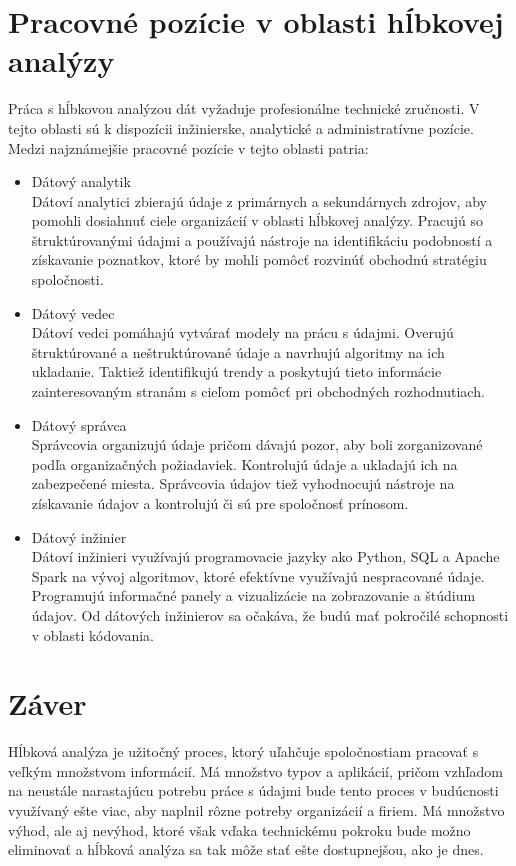 \documentclass[10pt,twoside,slovak,a4paper]{article}
\begin{document}
\section{Pracovné pozície v oblasti hĺbkovej analýzy}
Práca s hĺbkovou analýzou dát vyžaduje profesionálne technické zručnosti. V tejto oblasti sú k dispozícii inžinierske, analytické a administratívne pozície. Medzi najznámejšie pracovné pozície v tejto oblasti patria:
\begin{itemize}
\item Dátový analytik\\
Dátoví analytici zbierajú údaje z primárnych a sekundárnych zdrojov, aby pomohli dosiahnuť ciele organizácií v oblasti hĺbkovej analýzy. Pracujú so štruktúrovanými údajmi a používajú nástroje na identifikáciu podobností a získavanie poznatkov, ktoré by mohli pomôcť rozvinúť obchodnú stratégiu spoločnosti.
\item Dátový vedec\\
Dátoví vedci pomáhajú vytvárať modely na prácu s údajmi. Overujú štruktúrované a neštruktúrované údaje a navrhujú algoritmy na ich ukladanie. Taktiež identifikujú trendy a poskytujú tieto informácie zainteresovaným stranám s cieľom pomôcť pri obchodných rozhodnutiach.
\item Dátový správca\\
Správcovia organizujú údaje pričom dávajú pozor, aby boli zorganizované podľa organizačných požiadaviek. Kontrolujú údaje a ukladajú ich na zabezpečené miesta. Správcovia údajov tiež vyhodnocujú nástroje na získavanie údajov a kontrolujú či sú pre spoločnosť prínosom.
\item Dátový inžinier\\
Dátoví inžinieri využívajú programovacie jazyky ako Python, SQL a Apache Spark na vývoj algoritmov, ktoré efektívne využívajú nespracované údaje. Programujú informačné panely a vizualizácie na zobrazovanie a štúdium údajov. Od dátových inžinierov sa očakáva, že budú mať pokročilé schopnosti v oblasti kódovania.\cite{IET}
\end{itemize}
\section{Záver}
Hĺbková analýza je užitočný proces, ktorý uľahčuje spoločnostiam pracovať s veľkým množstvom informácií. Má množstvo typov a aplikácií, pričom vzhľadom na neustále narastajúcu potrebu práce s údajmi bude tento proces v budúcnosti využívaný ešte viac, aby naplnil rôzne potreby organizácií a firiem. Má množstvo výhod, ale aj nevýhod, ktoré však vďaka technickému pokroku bude možno eliminovať a hĺbková analýza sa tak môže stať ešte dostupnejšou, ako je dnes.


\end{document}
